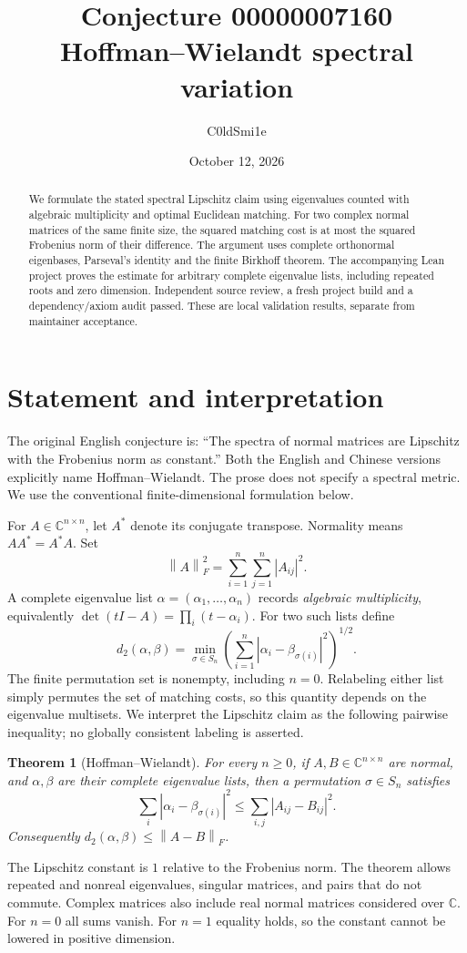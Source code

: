 \documentclass[11pt]{article}
\title{Conjecture 00000007160\\Hoffman--Wielandt spectral variation}
\author{C0ldSmi1e}
\date{October 12, 2026}
\newtheorem{theorem}{Theorem}
\newcommand{\C}{\mathbb C}
\newcommand{\norm}[1]{\left\lVert#1\right\rVert}
\begin{document}
\maketitle
\begin{abstract}
We formulate the stated spectral Lipschitz claim using eigenvalues counted with
algebraic multiplicity and optimal Euclidean matching. For two complex normal
matrices of the same finite size, the squared matching cost is at most the
squared Frobenius norm of their difference. The argument uses complete
orthonormal eigenbases, Parseval's identity and the finite Birkhoff theorem.
The accompanying Lean project proves the estimate for arbitrary complete
eigenvalue lists, including repeated roots and zero dimension. Independent
source review, a fresh project build and a dependency/axiom audit passed.
These are local validation results, separate from maintainer acceptance.
\end{abstract}

\section{Statement and interpretation}
The original English conjecture is: ``The spectra of normal matrices are
Lipschitz with the Frobenius norm as constant.'' Both the English and Chinese
versions explicitly name Hoffman--Wielandt. The prose does not specify a
spectral metric. We use the conventional finite-dimensional formulation below.

For $A\in\C^{n\times n}$, let $A^*$ denote its conjugate transpose. Normality
means $AA^*=A^*A$. Set
\[
 \norm{A}_F^2=\sum_{i=1}^n\sum_{j=1}^n |A_{ij}|^2.
\]
A complete eigenvalue list $\alpha=(\alpha_1,\ldots,\alpha_n)$ records
\emph{algebraic multiplicity}, equivalently
$\det(tI-A)=\prod_i(t-\alpha_i)$. For two such lists define
\[
 d_2(\alpha,\beta)
 =\min_{\sigma\in S_n}
   \left(\sum_{i=1}^n |\alpha_i-\beta_{\sigma(i)}|^2\right)^{1/2}.
\]
The finite permutation set is nonempty, including $n=0$. Relabeling either
list simply permutes the set of matching costs, so this quantity depends on
the eigenvalue multisets. We interpret the Lipschitz claim as the following
pairwise inequality; no globally consistent labeling is asserted.

\begin{theorem}[Hoffman--Wielandt]
For every $n\geq0$, if $A,B\in\C^{n\times n}$ are normal, and $\alpha,\beta$
are their complete eigenvalue lists, then a permutation $\sigma\in S_n$ satisfies
\[
 \sum_i |\alpha_i-\beta_{\sigma(i)}|^2
 \leq \sum_{i,j}|A_{ij}-B_{ij}|^2.
\]
Consequently $d_2(\alpha,\beta)\leq\norm{A-B}_F$.
\end{theorem}
The Lipschitz constant is $1$ relative to the Frobenius norm. The theorem
allows repeated and nonreal eigenvalues, singular matrices, and pairs that
do not commute. Complex matrices also include real normal matrices considered
over $\C$. For $n=0$ all sums vanish. For $n=1$ equality holds, so the
constant cannot be lowered in positive dimension.
\end{document}
